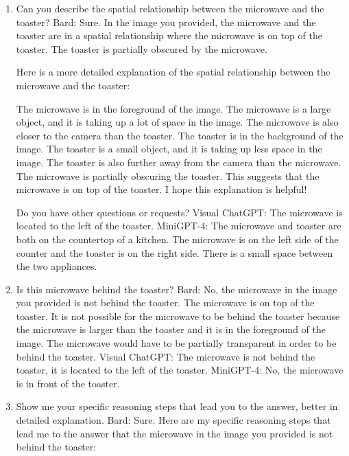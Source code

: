 \begin{enumerate}
    \item Can you describe the spatial relationship between the microwave and the toaster?
    \subitem Bard: Sure. In the image you provided, the microwave and the toaster are in a spatial relationship where the microwave is on top of the toaster. The toaster is partially obscured by the microwave.

    Here is a more detailed explanation of the spatial relationship between the microwave and the toaster:
    
    The microwave is in the foreground of the image. The microwave is a large object, and it is taking up a lot of space in the image. The microwave is also closer to the camera than the toaster.
    The toaster is in the background of the image. The toaster is a small object, and it is taking up less space in the image. The toaster is also further away from the camera than the microwave.
    The microwave is partially obscuring the toaster. This suggests that the microwave is on top of the toaster.
    I hope this explanation is helpful!
    
    Do you have other questions or requests?
    \subitem Visual ChatGPT: The microwave is located to the left of the toaster.
    \subitem MiniGPT-4: The microwave and toaster are both on the countertop of a kitchen. The microwave is on the left side of the counter and the toaster is on the right side. There is a small space between the two appliances.
    \item Is this microwave behind the toaster?
    \subitem Bard: 
    No, the microwave in the image you provided is not behind the toaster. The microwave is on top of the toaster. It is not possible for the microwave to be behind the toaster because the microwave is larger than the toaster and it is in the foreground of the image. The microwave would have to be partially transparent in order to be behind the toaster.
    \subitem Visual ChatGPT: The microwave is not behind the toaster, it is located to the left of the toaster.
    \subitem MiniGPT-4: No, the microwave is in front of the toaster.
    \item Show me your specific reasoning steps that lead you to the answer, better in detailed explanation.
    \subitem Bard: 
    Sure. Here are my specific reasoning steps that lead me to the answer that the microwave in the image you provided is not behind the toaster:


\end{enumerate}
